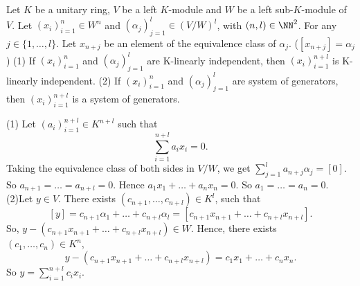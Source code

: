 \begin{theoremenv}\label{6.10.5}
    Let $K$ be a unitary ring, $V$ be a left $K$-module  and $W$ be a left sub-$K$-module of $V$. Let $(x_i)_{i=1}^{n}\in W^n$ and $\left(\alpha_j\right)_{j=1}^l\in \left(V/W\right)^l$, with $(n,l)\in \NN^2$. For any $j\in \{1,\dots,l\}$. Let $x_{n+j}$ be an element of the equivalence class of $\alpha_j$. ($[x_{n+j}]=\alpha_j$)
    \newline
    (1) If $(x_i)_{i=1}^n$ and $(\alpha_j)_{j=1}^l$ are K-linearly independent, then $(x_i)_{i=1}^{n+l}$ is K-linearly independent.
    \newline
    (2) If $(x_i)_{i=1}^{n}$ and $(\alpha_j)_{j=1}^l$ are system of generators, then $(x_i)_{i=1}^{n+l}$ is a system of generators. 
\end{theoremenv}
\begin{proofenv}
    \quad\newline
    (1) Let $(a_i)_{i=1}^{n+l}\in K^{n+l}$ such that 
    $$\sum_{i=1}^{n+l}a_ix_i=0.$$
    Taking the equivalence class of both sides in $V/W$, we get $\displaystyle \sum_{j=1}^{l}a_{n+j}\alpha_j=[0]$. So $a_{n+1}=\dots=a_{n+l}=0$. Hence $a_1x_1+\dots+a_nx_n=0$. So $a_1=\dots=a_n=0$.
    \newline
    (2)Let $y\in V$. There exists $(c_{n+1},\dots,c_{n+l})\in K^l$, such that 
    $$[y]=c_{n+1}\alpha_1+\dots +c_{n+l}\alpha_l=[c_{n+1}x_{n+1}+\dots+c_{n+l}x_{n+l}].$$
    So, $y-\left(c_{n+1}x_{n+1}+\dots+c_{n+l}x_{n+l}\right)\in W$. Hence, there exists $(c_1,\dots,c_n)\in K^n$,
    $$y-\left(c_{n+1}x_{n+1}+\dots+c_{n+l}x_{n+l}\right)=c_1x_1+\dots+c_nx_n.$$
    So $\displaystyle y= \sum_{i=1}^{n+l}c_ix_i$.
\end{proofenv}


